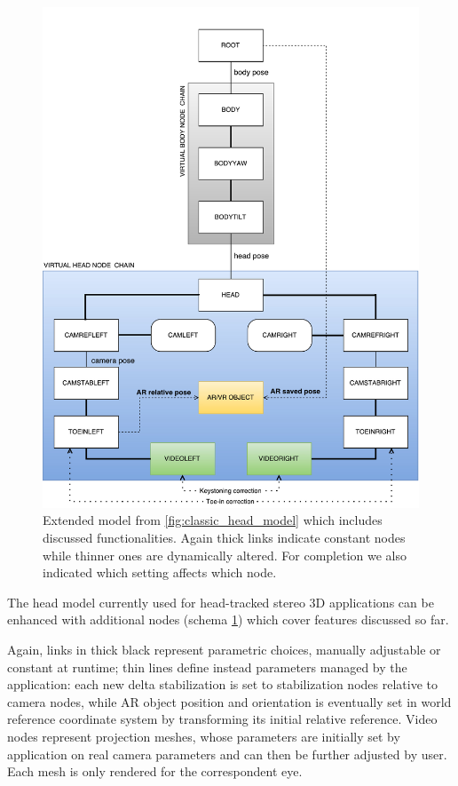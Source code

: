 \begin{figure}[h!]
\centering
\includegraphics[width=\linewidth]{schemas/enhanced-head-model_nodetree}
\caption{Extended model from \ref{fig:classic_head_model} which includes discussed functionalities. Again thick links indicate constant nodes while thinner ones are dynamically altered. For completion we also indicated which setting affects which node.}
\label{fig:enhanced_head_model}
\end{figure}

The head model currently used for head-tracked stereo 3D applications can be enhanced with additional nodes (schema \ref{fig:enhanced_head_model}) which cover features discussed so far.

Again, links in thick black represent parametric choices, manually adjustable or constant at runtime; thin lines define instead parameters managed by the application: each new delta stabilization is set to stabilization nodes relative to camera nodes, while AR object position and orientation is eventually set in world reference coordinate system by transforming its initial relative reference. Video nodes represent projection meshes, whose parameters are initially set by application on real camera parameters and can then be further adjusted by user. Each mesh is only rendered for the correspondent eye.

